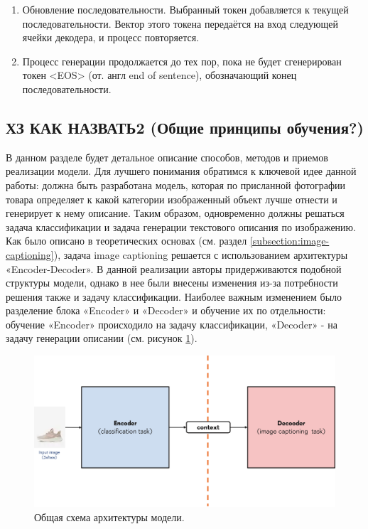 \documentclass[a4paper,12pt]{extarticle}
\begin{document}
\begin{enumerate}[label=\arabic*.]
\begin{itemize}
	\end{itemize}
	\item Обновление последовательности. Выбранный токен добавляется к текущей последовательности. Вектор этого токена передаётся на вход следующей ячейки декодера, и процесс повторяется.
	\item Процесс генерации продолжается до тех пор, пока не будет сгенерирован токен <EOS> (от. англ end of sentence), обозначающий конец последовательности.
\end{enumerate}

\subsection{ХЗ КАК НАЗВАТЬ2 (Общие принципы обучения?)}

В данном разделе будет детальное описание способов, методов и приемов реализации модели. Для лучшего понимания обратимся к ключевой идее данной работы: должна быть разработана модель, которая по присланной фотографии товара определяет к какой категории изображенный объект лучше отнести и генерирует к нему описание. Таким образом, одновременно должны решаться задача классификации и задача генерации текстового описания по изображению. Как было описано в теоретических основах (см. раздел \ref{subsection:image-captioning}), задача image captioning решается с использованием архитектуры «Encoder-Decoder». В данной реализации авторы придерживаются подобной структуры модели, однако в нее были внесены изменения из-за потребности решения также и задачу классификации. Наиболее важным изменением было разделение блока «Encoder» и «Decoder» и обучение их по отдельности: обучение «Encoder» происходило на задачу классификации, «Decoder» - на задачу генерации описании (см. рисунок \ref{fig:general_encoderdecoder_scheme}).

\begin{figure}[ht]
	\centering
	\includegraphics[scale=0.5]{general_encoderdecoder_scheme.png}
	\caption{Общая схема архитектуры модели.}
	\label{fig:general_encoderdecoder_scheme}
\end{figure}
\end{document}

